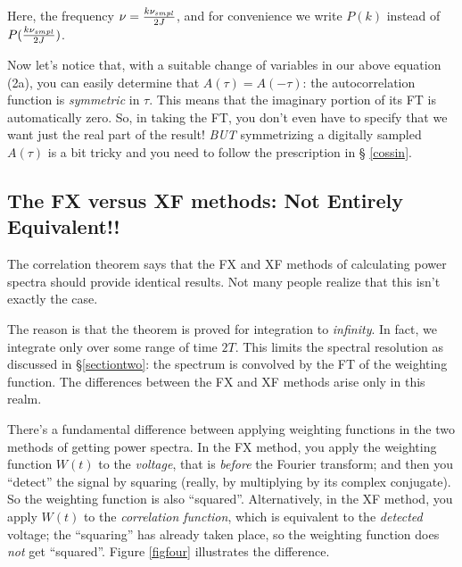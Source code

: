 \documentclass[preprint]{aastex}
\begin{document}
\noindent Here, the frequency $\nu = {k \nu_{smpl} \over 2J}$, and for
convenience we write $P(k)$ instead of $P({k \nu_{smpl} \over 2J})$.

        Now let's notice that, with a suitable change of variables in
our above equation (2a), you can easily determine that $A(\tau) =
A(-\tau)$: the autocorrelation function is {\it symmetric} in $\tau$.
This means that the imaginary portion of its FT is automatically zero.
So, in taking the FT, you don't even have to specify that we want just
the real part of the result! {\it BUT} symmetrizing a digitally sampled
$A(\tau)$ is a bit tricky and you need to follow the prescription in \S
\ref{cossin}.

\subsection{The FX versus XF methods: Not Entirely Equivalent!!}

	The correlation theorem says that the FX and XF methods of
calculating power spectra should provide identical results. Not many
people realize that this isn't exactly the case.

	The reason is that the theorem is proved for integration to
{\it infinity}. In fact, we integrate only over some range of time $2T$.
This limits the spectral resolution as discussed in \S \ref{sectiontwo}:
the spectrum is convolved by the FT of the weighting function. The
differences between the FX and XF methods arise only in this realm.

        There's a fundamental difference between applying weighting
functions in the two methods of getting power spectra.  In the FX
method, you apply the weighting function $W(t)$ to the {\it voltage},
that is {\it before} the Fourier transform; and then you ``detect'' the
signal by squaring (really, by multiplying by its complex conjugate). 
So the weighting function is also ``squared''. Alternatively, in the XF
method, you apply $W(t)$ to the {\it correlation function}, which is
equivalent to the {\it detected} voltage; the ``squaring'' has already
taken place, so the weighting function does {\it not} get ``squared''. 
Figure \ref{figfour} illustrates the difference.
\end{document}
